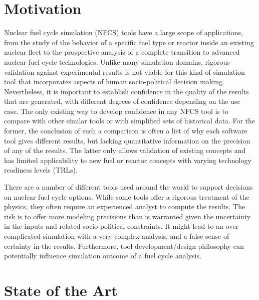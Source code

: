 
\section{Motivation}
Nuclear fuel cycle simulation (NFCS) tools have a large scope of applications,
from the study of the behavior of a specific fuel type or reactor inside an
existing nuclear fleet to the prospective analysis of a complete transition to
advanced nuclear fuel cycle technologies. Unlike many simulation domains,
rigorous validation against experimental results is not viable for this kind of
simulation tool that incorporates aspects of human socio-political decision
making.  Nevertheless, it is important to establish confidence in the quality of
the results that are generated, with different degrees of confidence depending
on the use case.  The only existing way to develop confidence in any NFCS tool
is to compare with other similar tools or with simplified sets of historical
data. For the former, the conclusion of such a comparison is often a list of why
each software tool gives different results, but lacking quantitative information
on the precision of any of the results. The latter only allows validation of
existing concepts and has limited applicability to new fuel or reactor concepts
with varying technology readiness levels (TRLs).

There are a number of different tools used around the world to support decisions
on nuclear fuel cycle options.  While some tools offer a rigorous treatment of
the physics, they often require an experienced analyst to compute the results.
The risk is to offer more modeling precisions than is warranted given the
uncertainty in the inputs and related socio-political constraints. It might lead
to an over-complicated simulation with a very complex analysis, and a false
sense of certainty in the results. Furthermore, tool development/design
philosophy can potentially influence simulation outcome of a fuel cycle
analysis.
\section{State of the Art}


